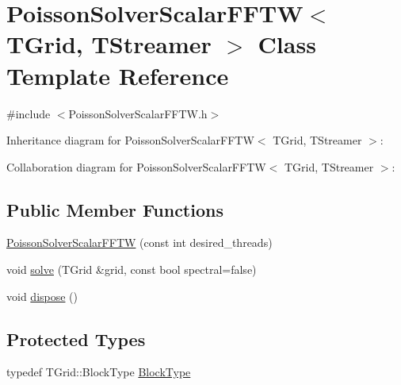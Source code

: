 \hypertarget{class_poisson_solver_scalar_f_f_t_w}{}\section{Poisson\+Solver\+Scalar\+F\+F\+T\+W$<$ T\+Grid, T\+Streamer $>$ Class Template Reference}
\label{class_poisson_solver_scalar_f_f_t_w}


{\ttfamily \#include $<$Poisson\+Solver\+Scalar\+F\+F\+T\+W.\+h$>$}



Inheritance diagram for Poisson\+Solver\+Scalar\+F\+F\+T\+W$<$ T\+Grid, T\+Streamer $>$\+:


Collaboration diagram for Poisson\+Solver\+Scalar\+F\+F\+T\+W$<$ T\+Grid, T\+Streamer $>$\+:
\subsection*{Public Member Functions}
\begin{DoxyCompactItemize}
\item 
\hyperlink{class_poisson_solver_scalar_f_f_t_w_ad30e877f71d90ed725b4f6dc073d15b1}{Poisson\+Solver\+Scalar\+F\+F\+T\+W} (const int desired\+\_\+threads)
\item 
void \hyperlink{class_poisson_solver_scalar_f_f_t_w_a888b94b2f63f4c95c70da076b30fb31c}{solve} (T\+Grid \&grid, const bool spectral=false)
\item 
void \hyperlink{class_poisson_solver_scalar_f_f_t_w_abf3881339c3ce8a3c25a7d609df542d2}{dispose} ()
\end{DoxyCompactItemize}
\subsection*{Protected Types}
\begin{DoxyCompactItemize}
\item 
typedef T\+Grid\+::\+Block\+Type \hyperlink{class_poisson_solver_scalar_f_f_t_w_ad496c7981a6167c70ccd329d4b37888d}{Block\+Type}
\end{DoxyCompactItemize}

